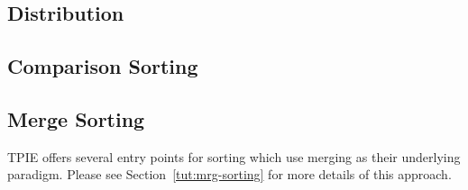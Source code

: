 

\subsection{Distribution}

\tobewritten


\subsection{Comparison Sorting}

\subsection{Merge Sorting} 

TPIE offers several entry points for sorting which use
merging as their underlying paradigm. Please see
Section~\ref{tut:mrg-sorting} for more details of this
approach.

